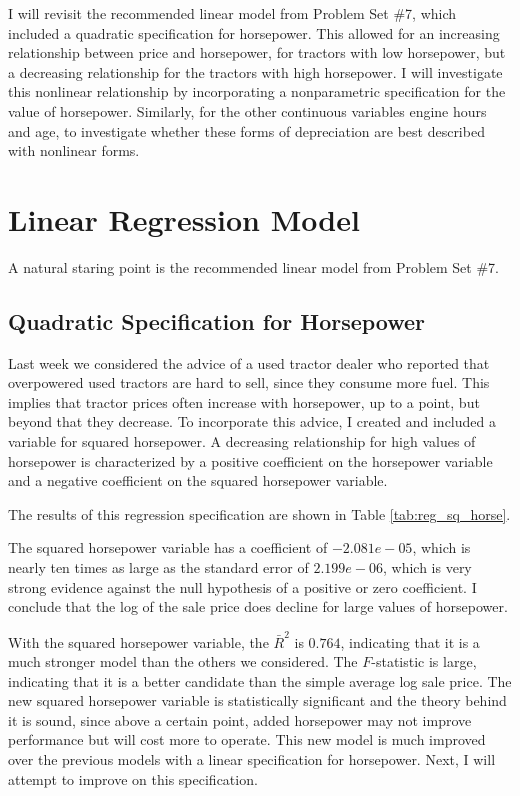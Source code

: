 \documentclass[11pt]{paper}
\begin{document}
I will revisit the recommended linear model
from Problem Set \#7, 
which included a quadratic specification for horsepower.
This allowed for an increasing relationship 
between price and horsepower, 
for tractors with low horsepower, 
but a decreasing relationship for the tractors with high horsepower. 
I will investigate this nonlinear relationship
by incorporating a nonparametric specification
for the value of horsepower. 
Similarly, for the other continuous variables engine hours and age, 
to investigate whether these forms of depreciation
are best described with nonlinear forms. 


\clearpage
\section{Linear Regression Model}

A natural staring point is the recommended linear model
from Problem Set \#7. 

\subsection{Quadratic Specification for Horsepower}

Last week we considered the advice of
a used tractor dealer who reported that overpowered used tractors are hard to sell, since they consume more fuel. 
This implies that tractor prices often increase with horsepower, up to a point, but beyond that they decrease. 
To incorporate this advice, I created and included a variable for squared horsepower. 
A decreasing relationship for high values of horsepower
is characterized by 
a positive coefficient on the horsepower variable and
a negative coefficient on the squared horsepower variable. 

The results of this regression specification are shown in 
Table \ref{tab:reg_sq_horse}. 
% 

% 
The squared horsepower variable has a coefficient of $-2.081e-05$, which is nearly ten times as large as the standard error of $2.199e-06$, which is very strong evidence against the null hypothesis of a positive or zero coefficient. 
I conclude that the log of the sale price does decline for large values of horsepower. 


With the squared horsepower variable, the $\bar{R}^2$ is $0.764$, indicating that it is a much stronger model than the others we considered. 
The $F$-statistic is large, indicating that it is a better candidate than the simple average log sale price. 
The new squared horsepower variable is statistically significant and the theory behind it is sound, since above a certain point, added horsepower may not improve performance but will cost more to operate. 
This new model is much improved over the previous models with a linear specification for horsepower.
Next, I will attempt to improve on this specification. 
\end{document}

